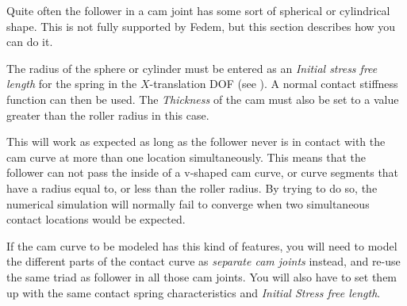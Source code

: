 Quite often the follower in a cam joint has some sort of spherical or
cylindrical shape. This is not fully supported by Fedem, but this
section describes how you can do it.

The radius of the sphere or cylinder must be entered as an
{\sl Initial stress free length} for the spring in the $X$-translation DOF
(see ).
A normal contact stiffness function can then be used.
The {\sl Thickness} of the cam must also be set to a value greater than
the roller radius in this case.

This will work as expected as long as the follower never is in contact
with the cam curve at more than one location simultaneously. This means
that the follower can not pass the inside of a v-shaped cam curve, or
curve segments that have a radius equal to, or less than the roller radius.
By trying to do so, the numerical simulation will normally fail to converge
when two simultaneous contact locations would be expected.

If the cam curve to be modeled has this kind of features, you will need to model
the different parts of the contact curve as {\sl separate cam joints} instead,
and re-use the same triad as follower in all those cam joints.
You will also have to set them up with the same contact spring
characteristics and {\sl Initial Stress free length}.

